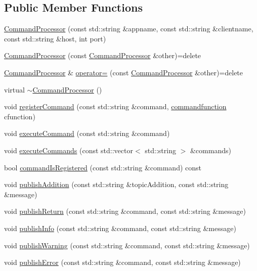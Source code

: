 \subsection*{Public Member Functions}
\begin{DoxyCompactItemize}
\item 
\hyperlink{class_command_processor_a053c5d39a7c42ddaeeab11467a052e98}{Command\+Processor} (const std\+::string \&appname, const std\+::string \&clientname, const std\+::string \&host, int port)
\item 
\hyperlink{class_command_processor_ad3ed59d0f22d979f2010a541a08c1ee3}{Command\+Processor} (const \hyperlink{class_command_processor}{Command\+Processor} \&other)=delete
\item 
\hyperlink{class_command_processor}{Command\+Processor} \& \hyperlink{class_command_processor_a1068633e1f6af69a67de06f10d8dba3a}{operator=} (const \hyperlink{class_command_processor}{Command\+Processor} \&other)=delete
\item 
virtual \hyperlink{class_command_processor_a8b975af12657aab33323c1b6c5bb2961}{$\sim$\+Command\+Processor} ()
\item 
void \hyperlink{class_command_processor_a72e15bc0082d628bd05aacedd5aa7ee0}{register\+Command} (const std\+::string \&command, \hyperlink{_command_processor_8h_a28db7178a71eff1027c055c9b19f6215}{commandfunction} cfunction)
\item 
void \hyperlink{class_command_processor_a3a830f1939e458f31f0cd2d42855609f}{execute\+Command} (const std\+::string \&command)
\item 
void \hyperlink{class_command_processor_a9c23c88fe12e643092993a8bb2aa0528}{execute\+Commands} (const std\+::vector$<$ std\+::string $>$ \&commands)
\item 
bool \hyperlink{class_command_processor_a11c9458174f6909a46b20d26bc489f68}{command\+Is\+Registered} (const std\+::string \&command) const 
\item 
void \hyperlink{class_command_processor_a88ad204c02a79887698c6abc93729a2d}{publish\+Addition} (const std\+::string \&topic\+Addition, const std\+::string \&message)
\item 
void \hyperlink{class_command_processor_ae97c2e58deecce8bd6dac0d081d73f03}{publish\+Return} (const std\+::string \&command, const std\+::string \&message)
\item 
void \hyperlink{class_command_processor_a0f5c17ab23203abee8a48c82f3338a28}{publish\+Info} (const std\+::string \&command, const std\+::string \&message)
\item 
void \hyperlink{class_command_processor_a0691a985030ebb0cef833aa779bedeab}{publish\+Warning} (const std\+::string \&command, const std\+::string \&message)
\item 
void \hyperlink{class_command_processor_a81e3fda8d03c8f5aea99a442ebdb0050}{publish\+Error} (const std\+::string \&command, const std\+::string \&message)
\end{DoxyCompactItemize}
